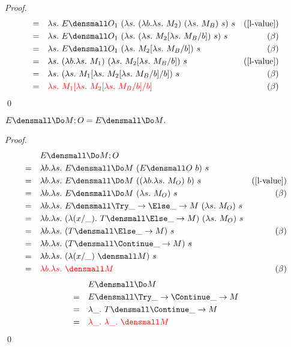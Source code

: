 \begin{proof}
\begin{align*}
            =& \quad \lambda s.~ E\den{O_1} ~(\lambda s. ~(\lambda b. \lambda s.~ M_2) ~(\lambda s.~ M_B) ~s) ~s & (\cref{l-value})\\
            =& \quad \lambda s.~ E\den{O_1} ~(\lambda s. ~(\lambda s.~ M_2\subst{b}{\lambda s.~ M_B}) ~s) ~s & (\beta) \\
            =& \quad \lambda s.~ E\den{O_1} ~(\lambda s. ~M_2\subst{b}{\lambda s.~ M_B}) ~s & (\beta)\\
            =& \quad \lambda s.~ (\lambda b. \lambda s.~ M_1) ~(\lambda s. ~M_2\subst{b}{\lambda s.~ M_B}) ~s & (\cref{l-value})\\
            =& \quad \lambda s.~ (\lambda s.~ M_1\subst{b}{\lambda s. ~M_2\subst{b}{\lambda s.~ M_B}}) ~s & (\beta)\\
            =& \quad \color{red}{\lambda s.~ M_1\subst{b}{\lambda s. ~M_2\subst{b}{\lambda s.~ M_B}}} & (\beta)
        \end{align*}
        \qed
    \end{proof}

\begin{lemma}
  \label{thm:ext-commit}
  $ E\den{\Do M; O} = E\den{\Do M}.$
\end{lemma}
    \begin{proof}
        \begin{align*}
            &\quad E\den{\Do M; O} \\
            =& \quad \lambda b. \lambda s.~ E\den{\Do M} ~(E\den{O} ~b) ~s \\
            =& \quad \lambda b. \lambda s.~ E\den{\Do M} ~((\lambda b. \lambda s.~ M_O) ~b) ~s & (\cref{l-value})\\
            =& \quad \lambda b. \lambda s.~ E\den{\Do M} ~(\lambda s.~ M_O) ~s & (\beta)\\
            =& \quad \lambda b. \lambda s.~ E\den{\Try \_ \to \Else \_ \to M} ~(\lambda s.~ M_O) ~s \\
            =& \quad \lambda b. \lambda s.~ (\lambda (x/\_). ~T\den{\Else \_ \to M}) ~(\lambda s.~ M_O) ~s \\
            =& \quad \lambda b. \lambda s.~ (T\den{\Else \_ \to M}) ~s & (\beta)\\
            =& \quad \lambda b. \lambda s.~ (T\den{\Continue \_ \to M}) ~s \\
            =& \quad \lambda b. \lambda s.~ (\lambda(x/\_) ~ \den{M}) ~s \\
            =& \quad \color{red}{\lambda b. \lambda s.~ \den{M}} & (\beta)
        \end{align*}
        \begin{align*}
            &\quad E\den{\Do M} \\
            =&\quad E\den{\Try \_ \to \Continue \_ \to M} \\
            =& \quad \lambda \_. ~T\den{\Continue \_ \to M} \\
            =& \quad \color{red}{\lambda \_. ~\lambda \_. ~  \den{M}}
        \end{align*}
        \qed
    \end{proof}

